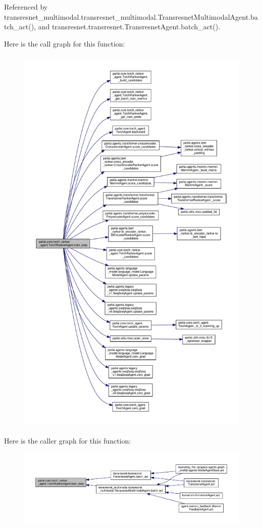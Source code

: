 Referenced by transresnet\+\_\+multimodal.\+transresnet\+\_\+multimodal.\+Transresnet\+Multimodal\+Agent.\+batch\+\_\+act(), and transresnet.\+transresnet.\+Transresnet\+Agent.\+batch\+\_\+act().

Here is the call graph for this function\+:
\nopagebreak
\begin{figure}[H]
\begin{center}
\leavevmode
\includegraphics[height=550pt]{classparlai_1_1core_1_1torch__ranker__agent_1_1TorchRankerAgent_a05ddf921f386f21116ec0ef50796987a_cgraph}
\end{center}
\end{figure}
Here is the caller graph for this function\+:
\nopagebreak
\begin{figure}[H]
\begin{center}
\leavevmode
\includegraphics[width=350pt]{classparlai_1_1core_1_1torch__ranker__agent_1_1TorchRankerAgent_a05ddf921f386f21116ec0ef50796987a_icgraph}
\end{center}
\end{figure}
